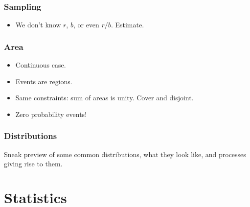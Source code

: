 \documentclass[t]{beamer}
\begin{document}
\begin{frame}
  \frametitle{Sampling}

  \begin{itemize}
  \item We don't know $r$, $b$, or even $r/b$.  Estimate.
  \end{itemize}

\end{frame}

\begin{frame}
  \frametitle{Area}

  \begin{itemize}
  \item Continuous case.
  \item Events are regions.
  \item Same constraints: sum of areas is unity.  Cover and disjoint.
  \item Zero probability events!
  \end{itemize}

\end{frame}

\begin{frame}
  \frametitle{Distributions}

  Sneak preview of some common distributions, what they look like, and processes giving rise to them.
\end{frame}


\section{Statistics}
\end{document}

